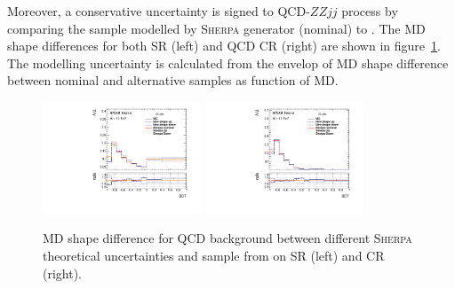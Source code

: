 Moreover, a conservative uncertainty is signed to QCD-$ZZjj$ process by comparing the sample modelled by \textsc{Sherpa} generator (nominal) to \MGMCatNLO.
The MD shape differences for both SR (left) and QCD CR (right) are shown in figure~\ref{fig:sys_exp_shmg}.
The modelling uncertainty is calculated from the envelop of MD shape difference between nominal and alternative samples as function of MD.
\begin{figure}
  \centering
  \includegraphics[width=0.42\textwidth]{figures/VBSZZ/syst/BDT_shape_nor_linear_SR.pdf}
  \includegraphics[width=0.42\textwidth]{figures/VBSZZ/syst/BDT_shape_nor_linear_CR.pdf}
  \caption{MD shape difference for QCD \qqZZ background between different \textsc{Sherpa} theoretical uncertainties and sample from \MGMCatNLO on SR (left) and CR (right).}
  \label{fig:sys_exp_shmg}
\end{figure}

